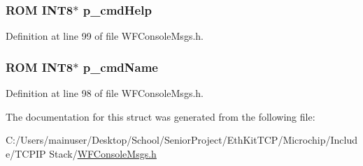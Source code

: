 \hypertarget{structmsg__struct_a0c7a0ebc03bca2a6d3b2debad125ff67}{}
\subsubsection[{p\+\_\+cmd\+Help}]{\setlength{\rightskip}{0pt plus 5cm}R\+O\+M {\bf I\+N\+T8}$\ast$ p\+\_\+cmd\+Help}\label{structmsg__struct_a0c7a0ebc03bca2a6d3b2debad125ff67}


Definition at line 99 of file W\+F\+Console\+Msgs.\+h.

\hypertarget{structmsg__struct_a2fecdf415b87c24720fb3dce6dce8eb9}{}
\subsubsection[{p\+\_\+cmd\+Name}]{\setlength{\rightskip}{0pt plus 5cm}R\+O\+M {\bf I\+N\+T8}$\ast$ p\+\_\+cmd\+Name}\label{structmsg__struct_a2fecdf415b87c24720fb3dce6dce8eb9}


Definition at line 98 of file W\+F\+Console\+Msgs.\+h.



The documentation for this struct was generated from the following file\+:\begin{DoxyCompactItemize}
\item 
C\+:/\+Users/mainuser/\+Desktop/\+School/\+Senior\+Project/\+Eth\+Kit\+T\+C\+P/\+Microchip/\+Include/\+T\+C\+P\+I\+P Stack/\hyperlink{_w_f_console_msgs_8h}{W\+F\+Console\+Msgs.\+h}\end{DoxyCompactItemize}
